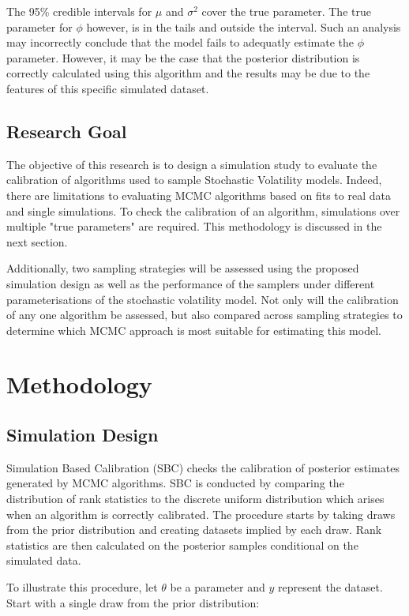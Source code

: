 \documentclass[12pt, a4paper]{article}
\begin{document}
    The 95\% credible intervals for $\mu$ and $\sigma^2$ cover the true parameter. The true parameter for $\phi$ however, is in the tails and outside the interval. Such an analysis may incorrectly conclude that the model fails to adequatly estimate the $\phi$ parameter. However, it may be the case that the posterior distribution is correctly calculated using this algorithm and the results may be due to the features of this specific simulated dataset.

\subsection{Research Goal}
    The objective of this research is to design a simulation study to evaluate the calibration of algorithms used to sample Stochastic Volatility models. Indeed, there are limitations to evaluating MCMC algorithms based on fits to real data and single simulations. To check the calibration of an algorithm, simulations over multiple "true parameters" are required. This methodology is discussed in the next section. 

    Additionally, two sampling strategies will be assessed using the proposed simulation design as well as the performance of the samplers under different parameterisations of the stochastic volatility model. Not only will the calibration of any one algorithm be assessed, but also compared across sampling strategies to determine which MCMC approach is most suitable for estimating this model. 

\section{Methodology}

    \subsection{Simulation Design}
        Simulation Based Calibration (SBC) checks the calibration of posterior estimates generated by MCMC algorithms. SBC is conducted by comparing the distribution of rank statistics to the discrete uniform distribution which arises when an algorithm is correctly calibrated. The procedure starts by taking draws from the prior distribution and creating datasets implied by each draw. Rank statistics are then calculated on the posterior samples conditional on the simulated data. 

        To illustrate this procedure, let $\theta$ be a parameter and $y$ represent the dataset. Start with a single draw from the prior distribution:
        
\end{document}
